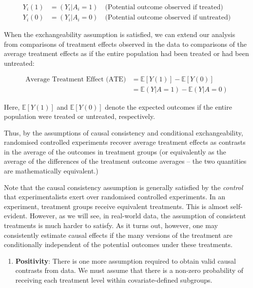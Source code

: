 \documentclass[
  singlecolumn]{article}
\providecommand{\tightlist}{%
  \setlength{\itemsep}{0pt}\setlength{\parskip}{0pt}}\usepackage{longtable,booktabs,array}
\begin{document}
\[
\begin{aligned}
Y_{i}(1) &= (Y_{i}|A_{i} = 1) \quad \text{(Potential outcome observed if treated)} \\
Y_{i}(0) &= (Y_{i}|A_{i} = 0) \quad \text{(Potential outcome observed if untreated)}
\end{aligned}
\]

When the exchangeability assumption is satisfied, we can extend our
analysis from comparisons of treatment effects observed in the data to
comparisons of the average treatment effects as if the entire population
had been treated or had been untreated:

\[
\begin{aligned}
\text{Average Treatment Effect (ATE)} &= \mathbb{E}[Y(1)] - \mathbb{E}[Y(0)] \\
&= \mathbb{E}(Y|A=1) - \mathbb{E}(Y|A=0)
\end{aligned}
\]

Here, \(\mathbb{E}[Y(1)]\) and \(\mathbb{E}[Y(0)]\) denote the expected
outcomes if the entire population were treated or untreated,
respectively.

Thus, by the assumptions of causal consistency and conditional
exchangeability, randomised controlled experiments recover average
treatment effects as contrasts in the average of the outcomes in
treatment groups (or equivalently as the average of the differences of
the treatment outcome averages -- the two quantities are mathematically
equivalent.)

Note that the causal consistency assumption is generally satisfied by
the \emph{control} that experimentalists exert over randomised
controlled experiments. In an experiment, treatment groups receive
equivalent treatments. This is almost self-evident. However, as we will
see, in real-world data, the assumption of consistent treatments is much
harder to satisfy. As it turns out, however, one may consistently
estimate causal effects if the many versions of the treatment are
conditionally independent of the potential outcomes under these
treatments.

\begin{enumerate}
\def\labelenumi{\arabic{enumi}.}
\setcounter{enumi}{2}
\tightlist
\item
  \textbf{Positivity}: There is one more assumption required to obtain
  valid causal contrasts from data. We must assume that there is a
  non-zero probability of receiving each treatment level within
  covariate-defined subgroups.
\end{enumerate}
\end{document}
